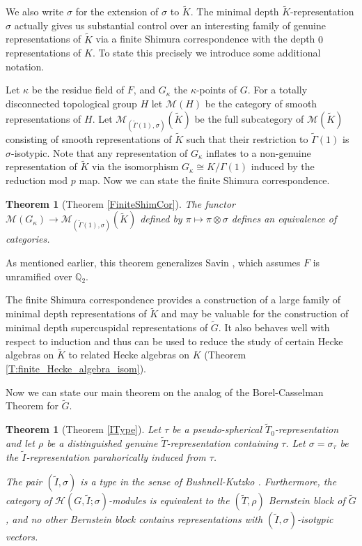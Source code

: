 \documentclass[10pt, letterpaper]{amsart}
\theoremstyle{plain}
\newtheorem{Thm}[equation]{Theorem}
\theoremstyle{definition}
\numberwithin{equation}{section}
\newcommand{\Q}{\mathbb{Q}}
\newcommand{\Gt}{\widetilde{G}}
\newcommand{\It}{\widetilde{I}}
\newcommand{\Kt}{\widetilde{K}}
\newcommand{\Tt}{\widetilde{T}}
\newcommand{\Gammat}{\widetilde{\Gamma}}
\newcommand{\Hcal}{\mathcal{H}}
\begin{document}
We also write $\sigma$ for the extension of $\sigma$ to $\Kt$. The minimal depth $\Kt$-representation $\sigma$ actually gives us substantial control over an interesting family of genuine representations of $\Kt$ via a finite Shimura correspondence with the depth $0$ representations of $K$. To state this precisely we introduce some additional notation. 

Let $\kappa$ be the residue field of $F$, and $G_\kappa$ the $\kappa$-points of $G$. For a totally disconnected topological group $H$ let $\mathcal{M}(H)$ be the category of smooth representations of $H$. Let $\mathcal{M}_{(\Gammat(1),\sigma)}(\Kt)$ be the full subcategory of $\mathcal{M}(\Kt)$ consisting of smooth representations of $\Kt$ such that their restriction to $\Gammat(1)$ is $\sigma$-isotypic. Note that any representation of $G_{\kappa}$ inflates to a non-genuine representation of $\Kt$ via the isomorphism $G_{\kappa}\cong K/\Gamma(1)$ induced by the reduction mod $p$ map. Now we can state the finite Shimura correspondence.

\begin{Thm}[Theorem \ref{FiniteShimCor}]
The functor $\mathcal{M}(G_{\kappa})\rightarrow \mathcal{M}_{(\Gammat(1),\sigma)}(\Kt)$ defined by $\pi\mapsto \pi\otimes\sigma$ defines an equivalence of categories. %
\end{Thm}
As mentioned earlier, this theorem generalizes Savin \cite[Theorem 4.1]{S12}, which assumes $F$ is unramified over $\Q_2$.

The finite Shimura correspondence provides a construction of a large family of minimal depth representations of $\Kt$ and may be valuable for the construction of minimal depth supercuspidal representations of $\Gt$. It also behaves well with respect to induction and thus can be used to reduce the study of certain Hecke algebras on $\Kt$ to related Hecke algebras on $K$ (Theorem \ref{T:finite_Hecke_algebra_isom}).

Now we can state our main theorem on the analog of the Borel-Casselman Theorem for $\Gt$.

\begin{Thm}[Theorem \ref{IType}]
Let $\tau$ be a pseudo-spherical $\Tt_{0}$-representation and let $\rho$ be a distinguished genuine $\Tt$-representation containing $\tau$. Let $\sigma=\sigma_{\tau}$ be the $\It$-representation parahorically induced from $\tau$.

The pair $(\It, \sigma)$ is a type in the sense of Bushnell-Kutzko \cite[(4.1) Definition]{BK98}. Furthermore, the category of $\Hcal(G, \It; \sigma)$-modules is equivalent to the $(\Tt, \rho)$ Bernstein block of $\Gt$, and no other Bernstein block contains representations with $(\It,\sigma)$-isotypic vectors.
\end{Thm}
\end{document}
